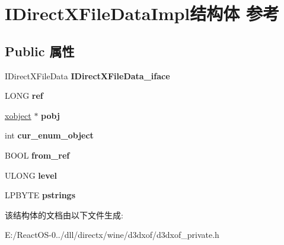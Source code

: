 \hypertarget{struct_i_direct_x_file_data_impl}{}\section{I\+Direct\+X\+File\+Data\+Impl结构体 参考}
\label{struct_i_direct_x_file_data_impl}
\subsection*{Public 属性}
\begin{DoxyCompactItemize}
\item 
\mbox{\label{struct_i_direct_x_file_data_impl_a0523bc7df87ee7d5d17139a7754320c2}} 
I\+Direct\+X\+File\+Data {\bfseries I\+Direct\+X\+File\+Data\+\_\+iface}
\item 
\mbox{\label{struct_i_direct_x_file_data_impl_a8e40a11575eaff95af0c4a10390ac4df}} 
L\+O\+NG {\bfseries ref}
\item 
\mbox{\label{struct_i_direct_x_file_data_impl_a17280cfe7e25a5b8c235a30620e5bf68}} 
\hyperlink{struct__xobject}{xobject} $\ast$ {\bfseries pobj}
\item 
\mbox{\label{struct_i_direct_x_file_data_impl_a7b738af49e97658385ec7f54ed850097}} 
int {\bfseries cur\+\_\+enum\+\_\+object}
\item 
\mbox{\label{struct_i_direct_x_file_data_impl_a0146fac2e9583ec3ff468916b4826328}} 
B\+O\+OL {\bfseries from\+\_\+ref}
\item 
\mbox{\label{struct_i_direct_x_file_data_impl_aa87b438fdad9a3d7093be787199473f8}} 
U\+L\+O\+NG {\bfseries level}
\item 
\mbox{\label{struct_i_direct_x_file_data_impl_a91b9d2e82464d78562cf1d384b3aba06}} 
L\+P\+B\+Y\+TE {\bfseries pstrings}
\end{DoxyCompactItemize}


该结构体的文档由以下文件生成\+:\begin{DoxyCompactItemize}
\item 
E\+:/\+React\+O\+S-\/0../dll/directx/wine/d3dxof/d3dxof\+\_\+private.\+h\end{DoxyCompactItemize}
